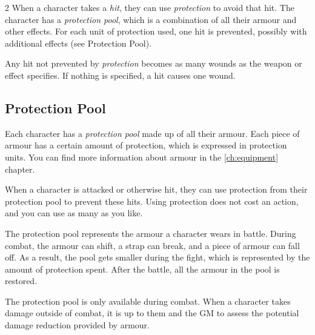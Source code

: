 \begin{multicols}{2}
When a character takes a \textit{hit}, they can use \textit{protection} to avoid that hit. The character has a \textit{protection pool}, which is a combination of all their armour and other effects. For each unit of protection used, one hit is prevented, possibly with additional effects (see Protection Pool).

Any hit not prevented by \textit{protection} becomes as many wounds as the weapon or effect specifies. If nothing is specified, a hit causes one wound.

\subsection{Protection Pool}

Each character has a \textit{protection pool} made up of all their armour. Each piece of armour has a certain amount of protection, which is expressed in protection units. You can find more information about armour in the \cref{ch:equipment} chapter.

When a character is attacked or otherwise hit, they can use protection from their protection pool to prevent these hits. Using protection does not cost an action, and you can use as many as you like.

The protection pool represents the armour a character wears in battle. During combat, the armour can shift, a strap can break, and a piece of armour can fall off. As a result, the pool gets smaller during the fight, which is represented by the amount of protection spent. After the battle, all the armour in the pool is restored.

The protection pool is only available during combat. When a character takes damage outside of combat, it is up to them and the GM to assess the potential damage reduction provided by armour.



\end{multicols}
